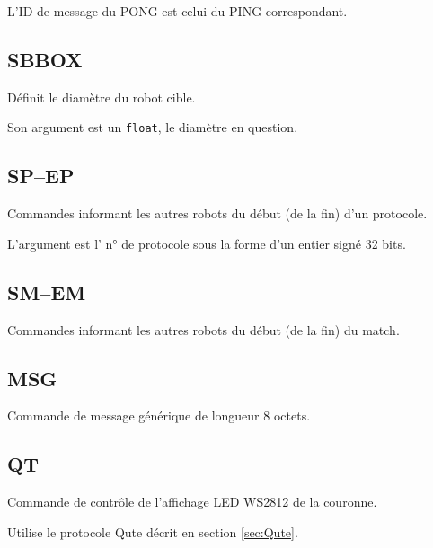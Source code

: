 	L'ID de message du PONG est celui du PING correspondant.

\subsection{SBBOX}
	\label{subsec:t:SBBOX}

	Définit le diamètre du robot cible.

	Son argument est un \verb|float|, le diamètre en question.

\subsection{SP--EP}
	\label{subsec:t:SP-EP}

	Commandes informant les autres robots du début (de la fin) d'un protocole.

	L'argument est l' n° de protocole sous la forme d'un entier signé 32 bits.

\subsection{SM--EM}
	\label{subsec:t:SM-EM}

	Commandes informant les autres robots du début (de la fin) du match.

\subsection{MSG}
	\label{subsec:t:MSG}

	Commande de message générique de longueur 8 octets.

\subsection{QT}
	\label{subsec:t:QT}

	Commande de contrôle de l'affichage LED WS2812 de la couronne.

	Utilise le protocole Qute décrit en section \ref{sec:Qute}.
